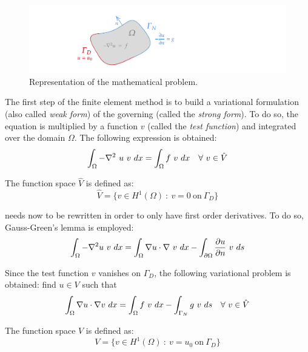 \begin{figure} [h]
    \centering
    \includegraphics[trim=50 0 200 0, clip, width=0.7\linewidth]{Figures/Chapter2/finite_element_problem_sketch.pdf}
    \caption{Representation of the mathematical problem.}
\end{figure}

The first step of the finite element method is to build a variational formulation (also called \textit{weak form}) of the governing  (called the \textit{strong form}).
To do so, the equation is multiplied by a function $v$ (called the \textit{test function}) and integrated over the domain $\Omega$.
The following expression is obtained:
\begin{equation}
    \int_{\Omega} -\nabla^2 \ u \ v \ dx = \int_{\Omega} f \ v \ dx \quad \forall \ v \in \hat{V}
    \labeq{weak form 1}
\end{equation}

The function space $\hat{V}$ is defined as:
\begin{equation}
    \hat{V} = \{ v \in H^1(\Omega) \ : \ v=0 \ \text{on} \ \Gamma_D \}
\end{equation}

 needs now to be rewritten in order to only have first order derivatives.
To do so, Gauss-Green's lemma is employed:
\begin{equation}
    \int_{\Omega} -\nabla^2 u \ v \ dx = \int_{\Omega} \nabla u \cdot \nabla \ v \ dx - \int_{\partial \Omega} \frac{\partial u}{\partial n} \ v \ ds
    \labeq{gauss-green}
\end{equation}

Since the test function $v$ vanishes on $\Gamma_D$, the following variational problem is obtained: find $u \in V$ such that
\begin{equation}
    \int_{\Omega} \nabla u \cdot \nabla v  \ dx = \int_{\Omega} f \ v \ dx - \int_{\Gamma_N} g \ v \ ds \quad \forall \ v \in \hat{V}
    \labeq{weak form 2}
\end{equation}

The function space $V$ is defined as:
\begin{equation}
    V = \{ v \in H^1(\Omega) \ : \ v=u_0 \ \text{on} \ \Gamma_D \}
\end{equation}


